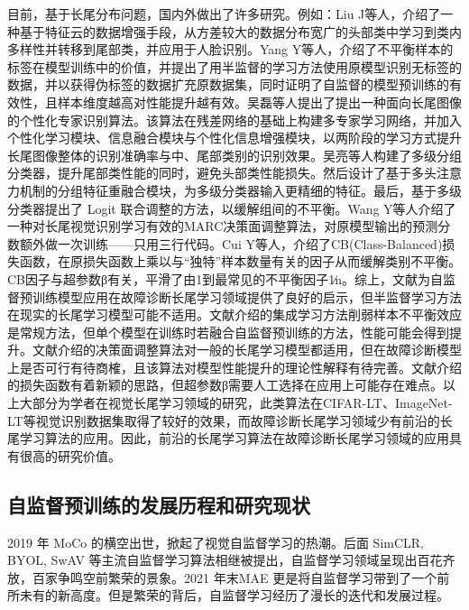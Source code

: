 \documentclass[master]{thesis-uestc}
\begin{document}
目前，基于长尾分布问题，国内外做出了许多研究。例如：Liu J等人，介绍了一种基于特征云的数据增强手段，从方差较大的数据分布宽广的头部类中学习到类内多样性并转移到尾部类，并应用于人脸识别。Yang Y等人，介绍了不平衡样本的标签在模型训练中的价值，并提出了用半监督的学习方法使用原模型识别无标签的数据，并以获得伪标签的数据扩充原数据集，同时证明了自监督的模型预训练的有效性，且样本维度越高对性能提升越有效。吴磊等人提出了提出一种面向长尾图像的个性化专家识别算法。该算法在残差网络的基础上构建多专家学习网络，并加入个性化学习模块、信息融合模块与个性化信息增强模块，以两阶段的学习方式提升长尾图像整体的识别准确率与中、尾部类别的识别效果。吴亮等人构建了多级分组分类器，提升尾部类性能的同时，避免头部类性能损失。然后设计了基于多头注意力机制的分组特征重融合模块，为多级分类器输入更精细的特征。最后，基于多级分类器提出了 Logit 联合调整的方法，以缓解组间的不平衡。Wang Y等人介绍了一种对长尾视觉识别学习有效的MARC决策面调整算法，对原模型输出的预测分数额外做一次训练——只用三行代码。Cui Y等人，介绍了CB(Class-Balanced)损失函数，在原损失函数上乘以与“独特”样本数量有关的因子从而缓解类别不平衡。CB因子与超参数β有关，平滑了由1到最常见的不平衡因子1∕n。综上，文献\cite{yang2020rethinking}为自监督预训练模型应用在故障诊断长尾学习领域提供了良好的启示，但半监督学习方法在现实的长尾学习模型可能不适用。文献\cite{wu2023personalized,吴亮2023基于多级学习的长尾分布下交通多目标检测}介绍的集成学习方法削弱样本不平衡效应是常规方法，但单个模型在训练时若融合自监督预训练的方法，性能可能会得到提升。文献\cite{wang2023margin}介绍的决策面调整算法对一般的长尾学习模型都适用，但在故障诊断模型上是否可行有待商榷，且该算法对模型性能提升的理论性解释有待完善。文献\cite{cui2019class}介绍的损失函数有着新颖的思路，但超参数β需要人工选择在应用上可能存在难点。以上大部分为学者在视觉长尾学习领域的研究，此类算法在CIFAR-LT、ImageNet-LT等视觉识别数据集取得了较好的效果，而故障诊断长尾学习领域少有前沿的长尾学习算法的应用。因此，前沿的长尾学习算法在故障诊断长尾学习领域的应用具有很高的研究价值。
\subsection{自监督预训练的发展历程和研究现状}
2019 年 MoCo 的横空出世，掀起了视觉自监督学习的热潮。后面 SimCLR\cite{chen2020simple}, BYOL, SwAV 等主流自监督学习算法相继被提出，自监督学习领域呈现出百花齐放，百家争鸣空前繁荣的景象。2021 年末MAE 更是将自监督学习带到了一个前所未有的新高度。但是繁荣的背后，自监督学习经历了漫长的迭代和发展过程。
\end{document}
